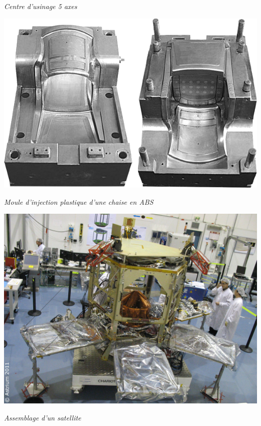 \documentclass[11pt,oneside]{article}
\begin{document}
\begin{exemple}
\begin{minipage}[c]{.22\linewidth}
\begin{center}
\textit{Centre d'usinage 5 axes}\cite{u5x}
\end{center}
\end{minipage}
\hfill
\begin{minipage}[c]{.22\linewidth}
\begin{center}
\includegraphics[width=.95\textwidth]{png/injection}

\textit{Moule d'injection plastique d'une chaise en ABS}\cite{injection}
\end{center}
\end{minipage}
\hfill
\begin{minipage}[c]{.22\linewidth}
\begin{center}
\includegraphics[width=.95\textwidth]{png/satellite}

\textit{Assemblage d'un satellite}\cite{satellite}
\end{center}
\end{minipage}

\end{exemple}
\end{document}
